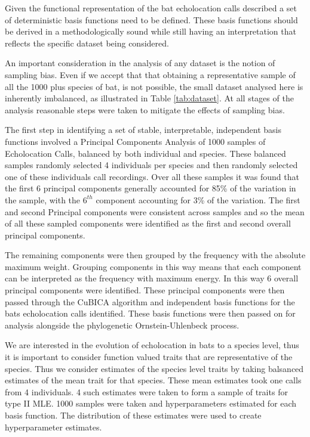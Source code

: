 \documentclass[wsdraft]{ws-rv9x6} %
\begin{document}
Given the functional representation of the bat echolocation calls described a set of deterministic basis functions need to be defined. These basis functions should be derived in a methodologically sound while still having an interpretation that reflects the specific dataset being considered. 

An important consideration in the analysis of any dataset is the notion of sampling bias. Even if we accept that that obtaining a representative sample of all the 1000 plus species of bat, is not possible, the small dataset analysed here is inherently imbalanced, as illustrated in Table \ref{tab:dataset}. At all stages of the analysis reasonable steps were taken to mitigate the effects of sampling bias.

The first step in identifying a set of stable, interpretable, independent basis functions involved a Principal Components Analysis of 1000 samples of Echolocation Calls, balanced by both individual and species. These balanced samples randomly selected 4 individuals per species and then  randomly selected one of these individuals call recordings. Over all these samples it was found that the first 6 principal components generally accounted for 85\% of the variation in the sample, with the \(6^{th}\) component accounting for 3\% of the variation. The first and second Principal components were consistent across samples and so the mean of all these sampled components were identified as the first and second overall principal components. 

The remaining components were then grouped by the frequency with the absolute maximum weight. Grouping components in this way means that each component can be interpreted as the frequency with maximum energy.
In this way 6 overall principal components were identified. These principal components were then passed through the CuBICA algorithm and independent basis functions for the bats echolocation calls identified. These basis functions were then passed on for analysis alongside the phylogenetic Ornstein-Uhlenbeck process.

We are interested in the evolution of echolocation in bats to a species level, thus it is important to consider function valued traits that are representative of the species. Thus we consider estimates of the species level traits by taking balsanced estimates of the mean trait for that species. These mean estimates took one calls from 4 individuals. 4 such estimates were taken to form a sample of traits for type II MLE. 1000 samples were taken and hyperparameters estimated for each basis function. The distribution of these estimates were used to create hyperparameter estimates.
\end{document}
